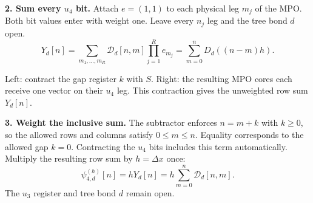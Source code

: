 \documentclass[11pt,a4paper]{article}
\newcommand{\note}[1]{{\small #1\par}}
\begin{document}
\textbf{2. Sum every \(u_4\) bit.}
Attach \(e=(1,1)\) to each physical leg \(m_j\) of the MPO\@. Both bit
values enter with weight one. Leave every \(n_j\) leg and the tree bond \(d\) open.
\[
 Y_d[n]=\sum_{m_1,\ldots,m_R}\mathcal D_d[n,m]\prod_{j=1}^{R}e_{m_j}
       =\sum_{m=0}^{n} D_d((n-m)h).
\]
\begin{center}
\end{center}
\note{Left: contract the gap register \(k\) with \(S\). Right: the resulting
MPO cores each receive one vector on their \(u_4\) leg. This contraction gives
the unweighted row sum \(Y_d[n]\).}

\textbf{3. Weight the inclusive sum.}
The subtractor enforces \(n=m+k\) with \(k\ge 0\), so the allowed rows and
columns satisfy \(0\le m\le n\). Equality corresponds to the allowed gap
\(k=0\). Contracting the \(u_4\) bits includes this term automatically.
Multiply the resulting row sum by \(h=\Delta x\) once:
\[
 \boxed{\psi_{4,d}^{(h)}[n]=hY_d[n]
       =h\sum_{m=0}^{n}\mathcal D_d[n,m].}
\]
The \(u_3\) register and tree bond \(d\) remain open.
\end{document}
